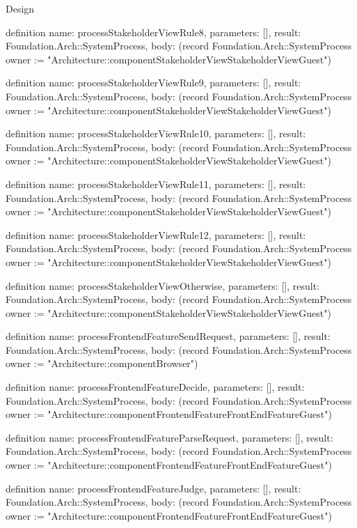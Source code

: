 \begin{lexlean}{Design}
\begin{semanticmodule}
definition{
  name: processStakeholderViewRule8,
  parameters: [],
  result: Foundation.Arch::SystemProcess,
  body: (record Foundation.Arch::SystemProcess {owner := "Architecture::componentStakeholderViewStakeholderViewGuest"})
}

definition{
  name: processStakeholderViewRule9,
  parameters: [],
  result: Foundation.Arch::SystemProcess,
  body: (record Foundation.Arch::SystemProcess {owner := "Architecture::componentStakeholderViewStakeholderViewGuest"})
}

definition{
  name: processStakeholderViewRule10,
  parameters: [],
  result: Foundation.Arch::SystemProcess,
  body: (record Foundation.Arch::SystemProcess {owner := "Architecture::componentStakeholderViewStakeholderViewGuest"})
}

definition{
  name: processStakeholderViewRule11,
  parameters: [],
  result: Foundation.Arch::SystemProcess,
  body: (record Foundation.Arch::SystemProcess {owner := "Architecture::componentStakeholderViewStakeholderViewGuest"})
}

definition{
  name: processStakeholderViewRule12,
  parameters: [],
  result: Foundation.Arch::SystemProcess,
  body: (record Foundation.Arch::SystemProcess {owner := "Architecture::componentStakeholderViewStakeholderViewGuest"})
}

definition{
  name: processStakeholderViewOtherwise,
  parameters: [],
  result: Foundation.Arch::SystemProcess,
  body: (record Foundation.Arch::SystemProcess {owner := "Architecture::componentStakeholderViewStakeholderViewGuest"})
}

definition{
  name: processFrontendFeatureSendRequest,
  parameters: [],
  result: Foundation.Arch::SystemProcess,
  body: (record Foundation.Arch::SystemProcess {owner := "Architecture::componentBrowser"})
}

definition{
  name: processFrontendFeatureDecide,
  parameters: [],
  result: Foundation.Arch::SystemProcess,
  body: (record Foundation.Arch::SystemProcess {owner := "Architecture::componentFrontendFeatureFrontEndFeatureGuest"})
}

definition{
  name: processFrontendFeatureParseRequest,
  parameters: [],
  result: Foundation.Arch::SystemProcess,
  body: (record Foundation.Arch::SystemProcess {owner := "Architecture::componentFrontendFeatureFrontEndFeatureGuest"})
}

definition{
  name: processFrontendFeatureJudge,
  parameters: [],
  result: Foundation.Arch::SystemProcess,
  body: (record Foundation.Arch::SystemProcess {owner := "Architecture::componentFrontendFeatureFrontEndFeatureGuest"})
}


\end{semanticmodule}
\end{lexlean}
